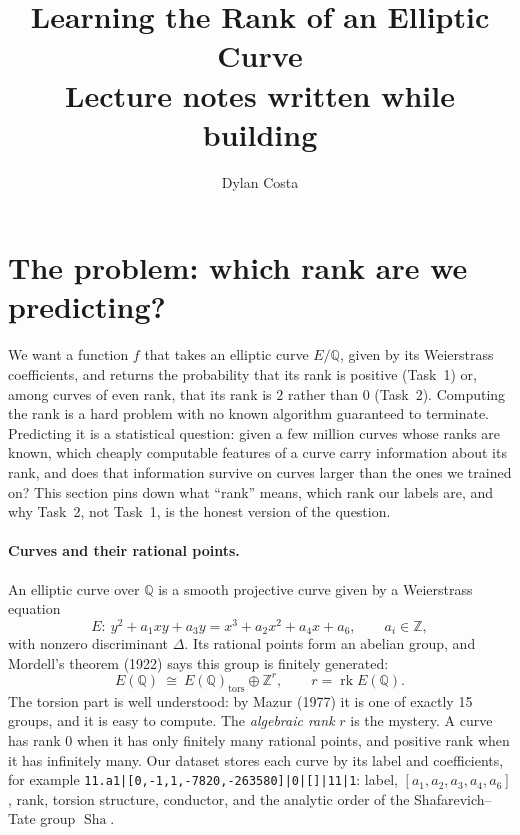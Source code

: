 \documentclass[11pt]{article}
\title{Learning the Rank of an Elliptic Curve\\[4pt]\large Lecture notes written while building \code{elliptic-curve-intelligence-lab}}
\author{Dylan Costa}
\date{}
\theoremstyle{definition}
\theoremstyle{plain}
\theoremstyle{remark}
\newcommand{\Q}{\mathbb{Q}}
\newcommand{\Z}{\mathbb{Z}}
\newcommand{\code}[1]{\texttt{#1}}
\renewcommand{\_}{\oldunderscore\allowbreak}
\DeclareMathOperator{\rk}{rk}
\DeclareMathOperator{\Sha}{Sha}
\begin{document}
\maketitle
\tableofcontents

\setcounter{section}{-1}

\section{The problem: which rank are we predicting?}
\label{sec:problem}

We want a function $f$ that takes an elliptic curve $E/\Q$, given by its Weierstrass
coefficients, and returns the probability that its rank is positive (Task~1) or, among curves
of even rank, that its rank is $2$ rather than $0$ (Task~2). Computing the rank is a hard
problem with no known algorithm guaranteed to terminate. Predicting it is a statistical
question: given a few million curves whose ranks are known, which cheaply computable features of
a curve carry information about its rank, and does that information survive on curves larger
than the ones we trained on? This section pins down what ``rank'' means, which rank our labels
are, and why Task~2, not Task~1, is the honest version of the question.

\paragraph{Curves and their rational points.}
An elliptic curve over $\Q$ is a smooth projective curve given by a Weierstrass equation
\[
  E:\ y^2+a_1xy+a_3y=x^3+a_2x^2+a_4x+a_6,\qquad a_i\in\Z,
\]
with nonzero discriminant $\Delta$. Its rational points form an abelian group, and
Mordell's theorem (1922) says this group is finitely generated:
\[
  E(\Q)\ \cong\ E(\Q)_{\mathrm{tors}}\oplus\Z^{r},\qquad r=\rk E(\Q).
\]
The torsion part is well understood: by Mazur (1977) it is one of exactly 15 groups, and
it is easy to compute. The \emph{algebraic rank} $r$ is the mystery. A curve has rank
$0$ when it has only finitely many rational points, and positive rank when it has infinitely
many. Our dataset stores each curve by its label and coefficients, for example
\code{11.a1|[0,-1,1,-7820,-263580]|0|[]|11|1}: label, $[a_1,a_2,a_3,a_4,a_6]$, rank, torsion
structure, conductor, and the analytic order of the Shafarevich--Tate group $\Sha$.
\end{document}
